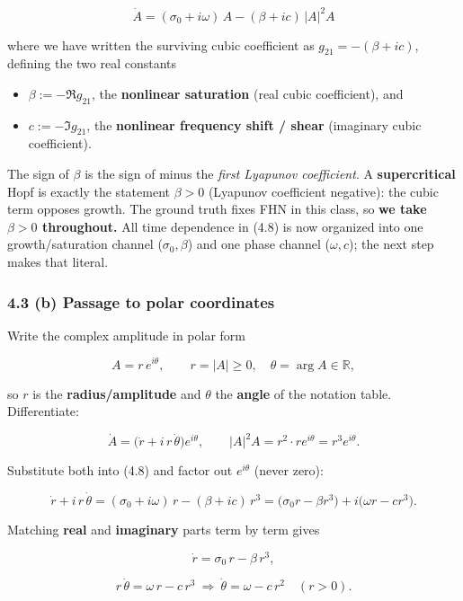 \documentclass[
  11pt,
]{article}
\providecommand{\tightlist}{%
  \setlength{\itemsep}{0pt}\setlength{\parskip}{0pt}}
\providecommand{\gt}{>}
\begin{document}
\[
\boxed{\ \dot A=(\sigma_0+i\omega)\,A-(\beta+i c)\,|A|^2A\ }
\tag{4.8}
\]

where we have written the surviving cubic coefficient as
\(g_{21}=-(\beta+ic)\), defining the two real constants

\begin{itemize}
\tightlist
\item
  \(\beta:=-\Re g_{21}\), the \textbf{nonlinear saturation} (real cubic
  coefficient), and
\item
  \(c:=-\Im g_{21}\), the \textbf{nonlinear frequency shift / shear}
  (imaginary cubic coefficient).
\end{itemize}

The sign of \(\beta\) is the sign of minus the \emph{first Lyapunov
coefficient}. A \textbf{supercritical} Hopf is exactly the statement
\(\beta\gt 0\) (Lyapunov coefficient negative): the cubic term opposes
growth. The ground truth fixes FHN in this class, so \textbf{we take
\(\beta\gt 0\) throughout.} All time dependence in (4.8) is now
organized into one growth/saturation channel (\(\sigma_0,\beta\)) and
one phase channel (\(\omega,c\)); the next step makes that literal.

\subsubsection{4.3 (b) Passage to polar
coordinates}\label{b-passage-to-polar-coordinates}

Write the complex amplitude in polar form

\[
A=r\,e^{i\theta},\qquad r=|A|\ge 0,\quad \theta=\arg A\in\mathbb{R},
\]

so \(r\) is the \textbf{radius/amplitude} and \(\theta\) the
\textbf{angle} of the notation table. Differentiate:

\[
\dot A=\big(\dot r+i\,r\,\dot\theta\big)e^{i\theta},
\qquad
|A|^2A=r^2\cdot r e^{i\theta}=r^3e^{i\theta}.
\]

Substitute both into (4.8) and factor out \(e^{i\theta}\) (never zero):

\[
\dot r+i\,r\,\dot\theta
=(\sigma_0+i\omega)\,r-(\beta+i c)\,r^3
=\big(\sigma_0 r-\beta r^3\big)+i\big(\omega r-c r^3\big).
\]

Matching \textbf{real} and \textbf{imaginary} parts term by term gives

\[
\dot r=\sigma_0\,r-\beta\,r^{3},
\tag{4.9}
\]

\[
r\,\dot\theta=\omega\,r-c\,r^{3}\ \Longrightarrow\ \dot\theta=\omega-c\,r^{2}\quad(r\gt 0).
\tag{4.10}
\]
\end{document}
